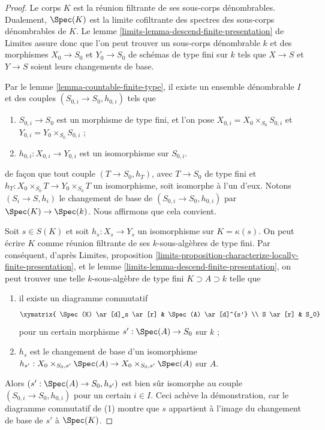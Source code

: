 \begin{proof}
Le corps $K$ est la réunion filtrante de ses sous-corps dénombrables.
Dualement, $\Spec(K)$ est la limite cofiltrante des spectres
des sous-corps dénombrables de $K$.
Le lemme \ref{limits-lemma-descend-finite-presentation} de Limites
assure donc que l'on peut trouver un sous-corps dénombrable
$k$ et des morphismes $X_0 \to S_0$ et $Y_0 \to S_0$
de schémas de type fini sur $k$ tels que
$X \to S$ et $Y \to S$ soient leurs changements de base.

\medskip\noindent
Par le lemme \ref{lemma-countable-finite-type}, il existe un ensemble dénombrable $I$ et
des couples $(S_{0, i} \to S_0, h_{0, i})$ tels que
\begin{enumerate}
\item $S_{0, i} \to S_0$ est un morphisme de type fini, et l'on pose
$X_{0, i} = X_0 \times_{S_0} S_{0, i}$ et
$Y_{0, i} = Y_0 \times_{S_0} S_{0, i}$ ;
\item $h_{0, i} : X_{0, i} \to Y_{0, i}$ est un isomorphisme sur $S_{0, i}$.
\end{enumerate}
de façon que tout couple $(T \to S_0, h_T)$, avec $T \to S_0$ de type fini
et $h_T : X_0 \times_{S_0} T \to Y_0 \times_{S_0} T$ un isomorphisme,
soit isomorphe à l'un d'eux.
Notons $(S_i \to S, h_i)$ le changement de base de $(S_{0, i} \to S_0, h_{0, i})$
par $\Spec(K) \to \Spec(k)$.
Nous affirmons que cela convient.

\medskip\noindent
Soit $s \in S(K)$ et soit $h_s : X_s \to Y_s$ un isomorphisme sur
$K = \kappa(s)$. On peut écrire $K$ comme réunion filtrante de ses
$k$-sous-algèbres de type fini. Par conséquent, d'après
Limites, proposition
\ref{limits-proposition-characterize-locally-finite-presentation}, et
le lemme \ref{limits-lemma-descend-finite-presentation},
on peut trouver une telle $k$-sous-algèbre de type fini
$K \supset A \supset k$ telle que
\begin{enumerate}
\item il existe un diagramme commutatif
$$
\xymatrix{
\Spec(K) \ar[d]_s \ar[r] &
\Spec(A) \ar[d]^{s'} \\
S \ar[r] &
S_0}
$$
pour un certain morphisme $s' : \Spec(A) \to S_0$ sur $k$ ;
\item $h_s$ est le changement de base d'un isomorphisme
$h_{s'} : X_0 \times_{S_0, s'} \Spec(A) \to
X_0 \times_{S_0, s'} \Spec(A)$ sur $A$.
\end{enumerate}
Alors $(s' : \Spec(A) \to S_0, h_{s'})$ est bien sûr isomorphe
au couple $(S_{0, i} \to S_0, h_{0, i})$ pour un certain $i \in I$.
Ceci achève la démonstration, car le diagramme commutatif
de (1) montre que $s$ appartient à l'image
du changement de base de $s'$ à $\Spec(K)$.
\end{proof}

